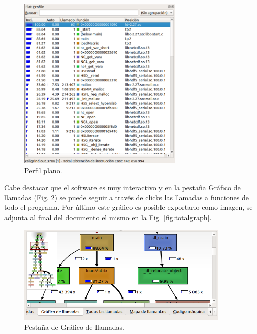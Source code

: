 \documentclass[a4paper]{article}
\begin{document}
\begin{figure}[H]
	\begin{center}		
	\includegraphics[width=0.7\textwidth]{006.png}
  	\caption{Perfil plano.}
  	\label{fig:grafcall}
  	\end{center}
\end{figure}

\clearpage

Cabe destacar que el software es muy interactivo y en la pestaña Gráfico de llamadas (Fig. \ref{fig:pestana}) se puede seguir a través de clicks las llamadas a funciones de todo el programa. Por último este gráfico es posible exportarlo como imagen, se adjunta al final del documento el mismo en la Fig. \ref{fig:totalgraph}.

\begin{figure}[]
	\begin{center}		
	\includegraphics[width=0.9\textwidth]{008.png}
  	\caption{Pestaña de Gráfico de llamadas.}
  	\label{fig:pestana}
  	\end{center}
\end{figure}
\end{document}

